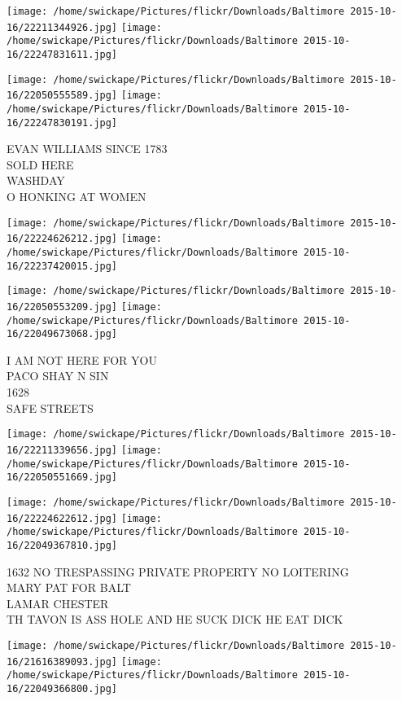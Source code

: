 \documentclass[10pt,letterpaper]{article}
\begin{document}
\texttt{[image: /home/swickape/Pictures/flickr/Downloads/Baltimore 2015-10-16/22211344926.jpg]}
\texttt{[image: /home/swickape/Pictures/flickr/Downloads/Baltimore 2015-10-16/22247831611.jpg]}

\texttt{[image: /home/swickape/Pictures/flickr/Downloads/Baltimore 2015-10-16/22050555589.jpg]}
\texttt{[image: /home/swickape/Pictures/flickr/Downloads/Baltimore 2015-10-16/22247830191.jpg]}

EVAN WILLIAMS SINCE 1783\\
SOLD HERE\\
WASHDAY\\
O HONKING AT WOMEN\\
\pagebreak

\texttt{[image: /home/swickape/Pictures/flickr/Downloads/Baltimore 2015-10-16/22224626212.jpg]}
\texttt{[image: /home/swickape/Pictures/flickr/Downloads/Baltimore 2015-10-16/22237420015.jpg]}

\texttt{[image: /home/swickape/Pictures/flickr/Downloads/Baltimore 2015-10-16/22050553209.jpg]}
\texttt{[image: /home/swickape/Pictures/flickr/Downloads/Baltimore 2015-10-16/22049673068.jpg]}

I AM NOT HERE FOR YOU\\
PACO SHAY N SIN\\
1628\\
SAFE STREETS\\
\pagebreak

\texttt{[image: /home/swickape/Pictures/flickr/Downloads/Baltimore 2015-10-16/22211339656.jpg]}
\texttt{[image: /home/swickape/Pictures/flickr/Downloads/Baltimore 2015-10-16/22050551669.jpg]}

\texttt{[image: /home/swickape/Pictures/flickr/Downloads/Baltimore 2015-10-16/22224622612.jpg]}
\texttt{[image: /home/swickape/Pictures/flickr/Downloads/Baltimore 2015-10-16/22049367810.jpg]}

1632 NO TRESPASSING PRIVATE PROPERTY NO LOITERING\\
MARY PAT FOR BALT\\
LAMAR CHESTER\\
TH TAVON IS ASS HOLE AND HE SUCK DICK HE EAT DICK\\
\pagebreak

\texttt{[image: /home/swickape/Pictures/flickr/Downloads/Baltimore 2015-10-16/21616389093.jpg]}
\texttt{[image: /home/swickape/Pictures/flickr/Downloads/Baltimore 2015-10-16/22049366800.jpg]}
\end{document}
